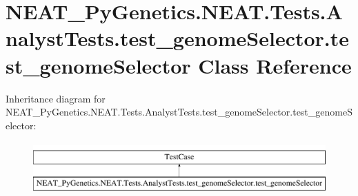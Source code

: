\hypertarget{classNEAT__PyGenetics_1_1NEAT_1_1Tests_1_1AnalystTests_1_1test__genomeSelector_1_1test__genomeSelector}{}\section{N\+E\+A\+T\+\_\+\+Py\+Genetics.\+N\+E\+A\+T.\+Tests.\+Analyst\+Tests.\+test\+\_\+genome\+Selector.\+test\+\_\+genome\+Selector Class Reference}
\label{classNEAT__PyGenetics_1_1NEAT_1_1Tests_1_1AnalystTests_1_1test__genomeSelector_1_1test__genomeSelector}
Inheritance diagram for N\+E\+A\+T\+\_\+\+Py\+Genetics.\+N\+E\+A\+T.\+Tests.\+Analyst\+Tests.\+test\+\_\+genome\+Selector.\+test\+\_\+genome\+Selector\+:\begin{figure}[H]
\begin{center}
\leavevmode
\includegraphics[height=2.000000cm]{classNEAT__PyGenetics_1_1NEAT_1_1Tests_1_1AnalystTests_1_1test__genomeSelector_1_1test__genomeSelector}
\end{center}
\end{figure}
